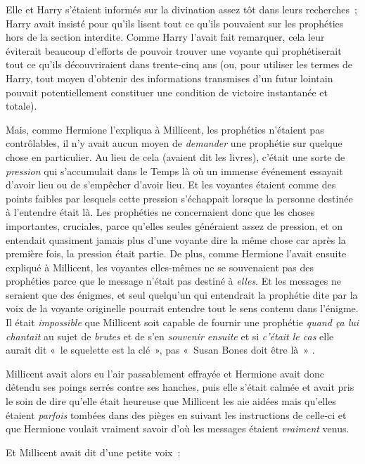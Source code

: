 Elle et Harry s'étaient informés sur la divination assez tôt dans leurs recherches~; Harry avait insisté pour qu'ils lisent tout ce qu'ils pouvaient sur les prophéties hors de la section interdite. Comme Harry l'avait fait remarquer, cela leur éviterait beaucoup d'efforts de pouvoir trouver une voyante qui prophétiserait tout ce qu'ils découvriraient dans trente-cinq ans (ou, pour utiliser les termes de Harry, tout moyen d'obtenir des informations transmises d'un futur lointain pouvait potentiellement constituer une condition de victoire instantanée et totale).

Mais, comme Hermione l'expliqua à Millicent, les prophéties n'étaient pas contrôlables, il n'y avait aucun moyen de \emph{demander} une prophétie sur quelque chose en particulier. Au lieu de cela (avaient dit les livres), c'était une sorte de \emph{pression} qui s'accumulait dans le Temps là où un immense événement essayait d'avoir lieu ou de s'empêcher d'avoir lieu. Et les voyantes étaient comme des points faibles par lesquels cette pression s'échappait lorsque la personne destinée à l'entendre était là. Les prophéties ne concernaient donc que les choses importantes, cruciales, parce qu'elles seules généraient assez de pression, et on entendait quasiment jamais plus d'une voyante dire la même chose car après la première fois, la pression était partie. De plus, comme Hermione l'avait ensuite expliqué à Millicent, les voyantes elles-mêmes ne se souvenaient pas des prophéties parce que le message n'était pas destiné à \emph{elles}. Et les messages ne seraient que des énigmes, et seul quelqu'un qui entendrait la prophétie dite par la voix de la voyante originelle pourrait entendre tout le sens contenu dans l'énigme. Il était \emph{impossible} que Millicent soit capable de fournir une prophétie \emph{quand ça lui chantait} au sujet de \emph{brutes} et de s'en \emph{souvenir ensuite} et si \emph{c'était le cas} elle aurait dit «~le squelette est la clé~», pas «~Susan Bones\footnotemark{} doit être là~»
.

Millicent avait alors eu l'air passablement effrayée et Hermione avait donc détendu ses poings serrés contre ses hanches, puis elle s'était calmée et avait pris le soin de dire qu'elle était heureuse que Millicent les aie aidées mais qu'elles étaient \emph{parfois} tombées dans des pièges en suivant les instructions de celle-ci et que Hermione voulait vraiment savoir d'où les messages étaient \emph{vraiment} venus.

Et Millicent avait dit d'une petite voix~:

